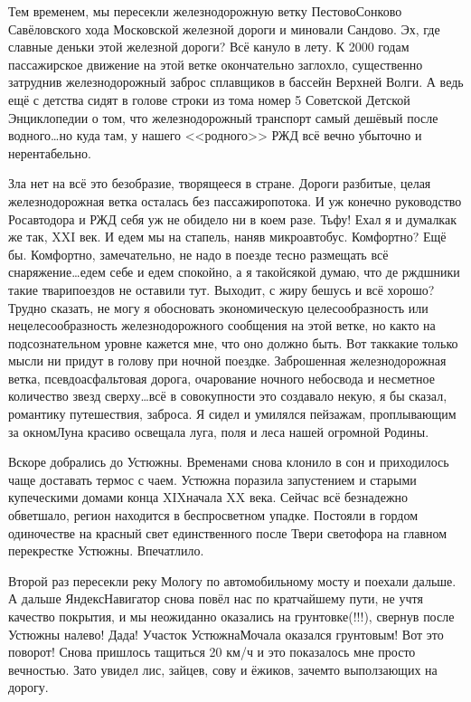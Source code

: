 Тем временем, мы пересекли железнодорожную ветку Пестово\sdash Сонково Савёловского хода Московской железной дороги и миновали Сандово. Эх, где славные деньки этой железной дороги? Всё кануло в лету. К 2000 годам пассажирское движение на этой ветке окончательно заглохло, существенно затруднив железнодорожный заброс сплавщиков в бассейн Верхней Волги. А ведь ещё с детства сидят в голове строки из тома номер 5 Советской Детской Энциклопедии о том, что железнодорожный транспорт самый дешёвый после водного\ldots  но куда там, у нашего <<родного>> РЖД всё вечно убыточно и нерентабельно. 

Зла нет на всё это безобразие, творящееся в стране. Дороги разбитые, целая железнодорожная ветка осталась без пассажиропотока. И уж конечно руководство Росавтодора и РЖД себя уж не обидело ни в коем разе. Тьфу! Ехал я и думал\mdash как же так, XXI век. И едем мы на стапель, наняв микроавтобус. Комфортно? Ещё бы. Комфортно, замечательно, не надо в поезде тесно размещать всё снаряжение\ldots  едем себе и едем спокойно, а я такой\sdash сякой думаю, что де ржд\sdash шники такие твари\mdash поездов не оставили тут. Выходит, с жиру бешусь и всё хорошо? Трудно сказать, не могу я обосновать экономическую целесообразность или нецелесообразность железнодорожного сообщения на этой ветке, но как\sdash то на подсознательном уровне кажется мне, что оно должно быть. Вот так\mdash какие только мысли ни придут в голову при ночной поездке. Заброшенная железнодорожная ветка, псевдоасфальтовая дорога, очарование ночного небосвода и несметное количество звезд сверху\ldots  всё в совокупности это создавало некую, я бы сказал, романтику путешествия, заброса. Я сидел и умилялся пейзажам, проплывающим за окном\mdash Луна красиво освещала луга, поля и леса нашей огромной Родины. 

Вскоре добрались до Устюжны. Временами снова клонило в сон и приходилось чаще доставать термос с чаем. Устюжна поразила запустением и старыми купеческими домами конца XIX\mdash начала XX века. Сейчас всё безнадежно обветшало, регион находится в беспросветном упадке. Постояли в гордом одиночестве на красный свет единственного после Твери светофора на главном перекрестке Устюжны. Впечатлило. 

Второй раз пересекли реку Мологу по автомобильному мосту и поехали дальше. А дальше Яндекс\sdash Навигатор снова повёл нас по кратчайшему пути, не учтя качество покрытия, и мы неожиданно оказались на грунтовке(!!!), свернув после Устюжны налево! Да\sdash да! Участок Устюжна\sdash Мочала оказался грунтовым! Вот это поворот! Снова пришлось тащиться 20 км/ч и это показалось мне просто вечностью. Зато увидел лис, зайцев, сову и ёжиков, зачем\sdash то выползающих на дорогу. 

